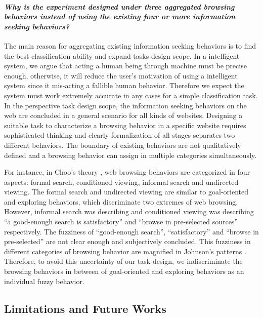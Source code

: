 \paragraph{\emph{Why is the experiment designed under three aggregated browsing behaviors instead of
using the existing four or more information seeking behaviors?}}

The main reason for aggregating existing information seeking behaviors is to find the best 
classification ability and expand tasks design scope.
In a intelligent system, we argue that acting a human being through machine must be precise enough,
otherwise, it will reduce the user's motivation of using a intelligent system since
it mis-acting a fallible human behavior. Therefore we expect the system must work
extremely accurate in any cases for a simple classification task.
In the perspective task design scope, the information seeking behaviors on the web 
are concluded in a general scenario for all kinds of websites. Designing a suitable task 
 to characterize a browsing behavior in a specific website requires sophisticated thinking 
and clearly formalization of all stages separates two different behaviors.
The boundary of existing behaviors are not qualitatively defined and a browsing behavior
can assign in multiple categories simultaneously.

For instance, in Choo's theory \cite{choo1999information}, web browsing behaviors 
are categorized in four aspects:
formal search, conditioned viewing, informal search and undirected viewing.
The formal search and undirected viewing are similar to goal-oriented and exploring behaviors,
which discriminate two extremes of web browsing.
However, informal search was describing and conditioned viewing was describing
``a good-enough search is satisfactory'' and ``browse in pre-selected sources'' respectively.
The fuzziness of ``good-enough search'', ``satisfactory'' and ``browse in pre-selected''
are not clear enough and subjectively concluded. This fuzziness in different categories of browsing
behavior are magnified in Johnson's patterns \cite{johnson2017patterns}.
Therefore, to avoid this uncertainty of our task design, we indiscriminate the browsing behaviors
in between of goal-oriented and exploring behaviors as an individual fuzzy behavior.

\subsection{Limitations and Future Works}

